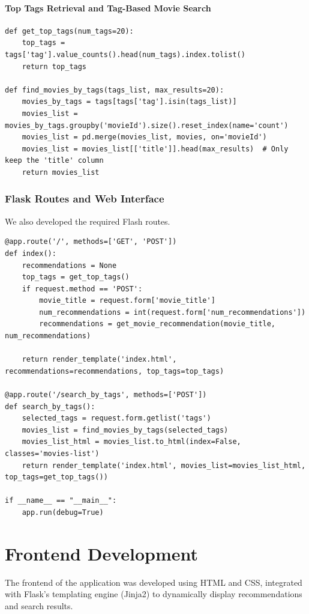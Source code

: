 \documentclass[conference]{IEEEtran}
\begin{document}
\paragraph{Top Tags Retrieval and Tag-Based Movie Search}
\begin{lstlisting}
def get_top_tags(num_tags=20):
    top_tags = tags['tag'].value_counts().head(num_tags).index.tolist()
    return top_tags

def find_movies_by_tags(tags_list, max_results=20):
    movies_by_tags = tags[tags['tag'].isin(tags_list)]
    movies_list = movies_by_tags.groupby('movieId').size().reset_index(name='count')
    movies_list = pd.merge(movies_list, movies, on='movieId')
    movies_list = movies_list[['title']].head(max_results)  # Only keep the 'title' column
    return movies_list
\end{lstlisting}


\subsubsection{Flask Routes and Web Interface}

We also developed the required Flash routes.
\begin{lstlisting}
@app.route('/', methods=['GET', 'POST'])
def index():
    recommendations = None
    top_tags = get_top_tags()
    if request.method == 'POST':
        movie_title = request.form['movie_title']
        num_recommendations = int(request.form['num_recommendations'])
        recommendations = get_movie_recommendation(movie_title, num_recommendations)
        
    return render_template('index.html', recommendations=recommendations, top_tags=top_tags)

@app.route('/search_by_tags', methods=['POST'])
def search_by_tags():
    selected_tags = request.form.getlist('tags')
    movies_list = find_movies_by_tags(selected_tags)
    movies_list_html = movies_list.to_html(index=False, classes='movies-list')
    return render_template('index.html', movies_list=movies_list_html, top_tags=get_top_tags())

if __name__ == "__main__":
    app.run(debug=True)
\end{lstlisting}

\section{Frontend Development}
The frontend of the application was developed using HTML and CSS, integrated with Flask's templating engine (Jinja2) to dynamically display recommendations and search results.
\end{document}
